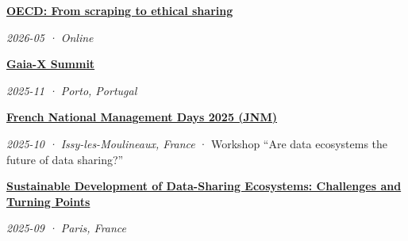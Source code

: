 \documentclass[11pt,a4paper]{article}
\newlength{\cvindent}
\newenvironment{cvblock}[1][1]{%
  \par\noindent\hspace*{#1\cvindent}%
  \begin{minipage}{\dimexpr\linewidth-#1\cvindent\relax}%
}{%
  \end{minipage}\par
}
\newenvironment{cvdetails}{%
  \begin{list}{}{%
    \setlength{\leftmargin}{\cvindent}%
    \setlength{\rightmargin}{0pt}%
    \setlength{\topsep}{0.1em}%
    \setlength{\partopsep}{0pt}%
    \setlength{\parsep}{0.05em}%
    \setlength{\itemsep}{0pt}%
  }\item[]\small\ignorespaces
}{%
  \end{list}
}
\begin{document}
\begin{cvblock}[2]
\textbf{\href{https://oecd.ai/en/wonk/documents/from-scraping-to-ethical-sharing-initial-considerations-for-virtuous-innovative-approaches-and-data-use-collaboration-in-ai-training-viaduct}{OECD: From scraping to ethical sharing}}\par
\begin{cvdetails}
{\small\itshape 2026-05 · Online}\par
\end{cvdetails}
\end{cvblock}\par\vspace{0.35em}

\begin{cvblock}[2]
\textbf{\href{https://gaia-x.eu/summit-2025/}{Gaia-X Summit}}\par
\begin{cvdetails}
{\small\itshape 2025-11 · Porto, Portugal}\par
\end{cvdetails}
\end{cvblock}\par\vspace{0.35em}

\begin{cvblock}[2]
\textbf{\href{https://digipad.app/p/1136550/f7ad9c6a3886f}{French National Management Days 2025 (JNM)}}\par
\begin{cvdetails}
{\small\itshape 2025-10 · Issy-les-Moulineaux, France} · Workshop ``Are data ecosystems the future of data sharing?''\par
\end{cvdetails}
\end{cvblock}\par\vspace{0.35em}

\begin{cvblock}[2]
\textbf{\href{https://www.fondation-dauphine.fr/agenda/2025/08/sustainable-development-data-sharing-ecosystems-challenges-and-turning-points}{Sustainable Development of Data-Sharing Ecosystems: Challenges and Turning Points}}\par
\begin{cvdetails}
{\small\itshape 2025-09 · Paris, France}\par
\end{cvdetails}
\end{cvblock}\par\vspace{0.35em}
\end{document}
